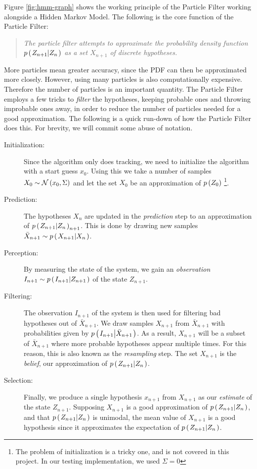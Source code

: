 Figure \ref{fig:hmm-graph} shows the working principle of the Particle Filter working alongside a Hidden Markov Model. The following is the core function of the Particle Filter:

\begin{quote}
  \emph{The particle filter attempts to approximate the probability density function $p\left(\left. Z_{n+1} \middle\vert Z_n \right.\right)$ as a set $X_{n+1}$ of discrete hypotheses.}
\end{quote}

More particles mean greater accuracy, since the PDF can then be approximated more closely. However, using many particles is also computationally expensive. Therefore the number of particles is an important quantity. The Particle Filter employs a few tricks to \emph{filter} the hypotheses, keeping probable ones and throwing improbable ones away, in order to reduce the number of particles needed for a good approximation. The following is a quick run-down of how the Particle Filter does this. For brevity, we will commit some abuse of notation.

\begin{description}
\item[Initialization:] Since the algorithm only does tracking, we need to initialize the algorithm with a start guess $x_0$. Using this we take a number of samples $X_0 \sim \mathcal{N}\left(x_0, \Sigma\right)$ and let the set $X_0$ be an approximation of $p\left(Z_0\right)$ \footnote{The problem of initialization is a tricky one\cite{Hedvig}, and is not covered in this project. In our testing implementation, we used $\Sigma = 0$}.
\item[Prediction:] The hypotheses $X_n$ are updated in the \emph{prediction} step to an approximation of $p\left(\left. Z_{n+1} \middle\vert Z_n \right.\right)_{n+1}$. This is done by drawing new samples $\bar{X}_{n+1} \sim p\left(\left. X_{n+1} \middle\vert X_n \right.\right)$.
\item[Perception:] By measuring the state of the system, we gain an \emph{observation} $I_{n+1} \sim p\left(\left. I_{n+1} \middle\vert Z_{n+1} \right.\right)$ of the state $Z_{n+1}$.
\item[Filtering:] The observation $I_{n+1}$ of the system is then used for filtering bad hypotheses out of $\bar{X}_{n+1}$. We draw samples $X_{n+1}$ from $\bar{X}_{n+1}$ with probabilities given by $p\left(\left. I_{n+1} \middle\vert \bar{X}_{n+1} \right.\right)$. As a result, $X_{n+1}$ will be a subset of $\bar{X}_{n+1}$ where more probable hypotheses appear multiple times. For this reason, this is also known as the \emph{resampling} step. The set $X_{n+1}$ is the \emph{belief}, our approximation of $p\left(\left. Z_{n+1} \middle\vert Z_n \right.\right)$.
\item[Selection:] Finally, we produce a single hypothesis $x_{n+1}$ from $X_{n+1}$ as our \emph{estimate} of the state $Z_{n+1}$. Supposing $X_{n+1}$ is a good approximation of $p\left(\left. Z_{n+1} \middle\vert Z_n \right.\right)$, and that $p\left(\left. Z_{n+1} \middle\vert Z_n \right.\right)$ is unimodal, the mean value of $X_{n+1}$ is a good hypothesis since it approximates the expectation of $p\left(\left. Z_{n+1} \middle\vert Z_n \right.\right)$.
\end{description}


